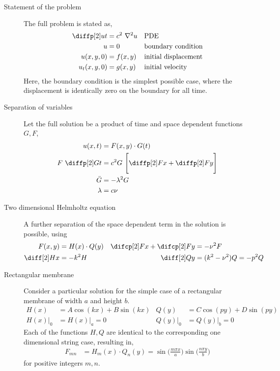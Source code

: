 \begin{description}
    \item[Statement of the problem] The full problem is stated as,
        \begin{align}
            \diffp[2] ut & = c^2\ \nabla^2 u &  & \text{PDE}                  \\
            u            & = 0               &  & \text{boundary condition}   \\
            u(x, y, 0)   & = f(x, y)         &  & \text{initial displacement} \\
            u_t(x, y, 0) & = g(x, y)         &  & \text{initial velocity}
        \end{align}
        Here, the boundary condition is the simplest possible case, where the
        displacement is identically zero on the boundary for all time.

    \item[Separation of variables] Let the full solution be a product of time and space
        dependent functions $ G, F $,
        \begin{align}
            u(x, t)         & = F(x, y) \cdot G(t)                              \\
            F\ \diffp[2] Gt & = c^2G\ \Bigg[ \diffp[2] Fx + \diffp[2] Fy \Bigg] \\
            \ddot{G}        & = -\lambda^2 G                                    \\
            \lambda         & = c\nu
        \end{align}

    \item[Two dimensional Helmholtz equation] A further separation of the space dependent
        term in the solution is possible, using
        \begin{align}
            F(x, y)                     & = H(x) \cdot Q(y)         &
            \difcp[2] Fx + \difcp[2] Fy & = -\nu^2 F                  \\
            \diff[2] Hx                 & = -k^2H                   &
            \diff[2] Qy                 & = (k^2 - \nu^2)Q = -p^2 Q
        \end{align}

    \item[Rectangular membrane] Consider a particular solution for the simple case
        of a rectangular membrane of width $ a $ and height $ b $.
        \begin{align}
            H(x)        & = A\cos(kx) + B \sin(kx) &
            Q(y)        & = C\cos(py) + D \sin(py)   \\
            H(x)\Big|_0 & = H(x)\Big|_a = 0        &
            Q(y)\Big|_0 & = Q(y)\Big|_b = 0
        \end{align}
        Each of the functions $ H, Q $ are identical to the corresponding one dimensional
        string case, resulting in,
        \begin{align}
            F_{mn} & = H_m(x) \cdot Q_n(y) = \sin\Bigg( \frac{m\pi x}{a} \Bigg)
            \sin\Bigg( \frac{n\pi y}{b}\Bigg)
        \end{align}
        for positive integers $ m, n $.


\end{description}
